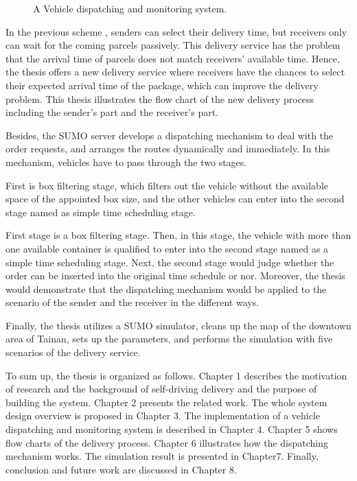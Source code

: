 \documentclass[12pt]{ksthesis}
\begin{document}
\begin{thesis}
{\begin{figure}[t]
\caption{\large A Vehicle dispatching and monitoring system.}
\vspace{0.5cm}
\label{Fig:System_Overview}
\end{figure}

In the previous scheme \cite{Jiang2018}, senders can select their delivery time, but receivers only can wait for the coming parcels passively. This delivery service has the problem that the arrival time of parcels does not match receivers’ available time. Hence, the thesis offers a new delivery service where receivers have the chances to select their expected arrival time of the package, which can improve the delivery problem. This thesis illustrates the flow chart of the new delivery process including the sender’s part and the receiver’s part.

Besides, the SUMO server develops a dispatching mechanism to deal with the order requests, and arranges the routes dynamically and immediately. In this mechanism, vehicles have to pass through the two stages. 

First is box filtering stage, which filters out the vehicle without the available space of the appointed box size, and the other vehicles can enter into the second stage named as simple time scheduling stage. 

First stage is a box filtering stage. Then, in this stage, the vehicle with more than one available container is qualified to enter into the second stage named as a simple time scheduling stage. Next, the second stage would judge whether the order can be inserted into the original time schedule or nor. Moreover, the thesis would demonstrate that the dispatching mechanism would be applied to the scenario of the sender and the receiver in the different ways.

Finally, the thesis utilizes a SUMO simulator, cleans up the map of the downtown area of Tainan, sets up the parameters, and performs the simulation with five scenarios of the delivery service.

To sum up, the thesis is organized as follows. Chapter 1 describes the motivation of research and the background of self-driving delivery and the purpose of building the system. Chapter 2 presents the related work. The whole system design overview is proposed in Chapter 3. The implementation of a vehicle dispatching and monitoring system is described in Chapter 4. Chapter 5 shows flow charts of the delivery process.  Chapter 6 illustrates how the dispatching mechanism works. The simulation result is presented in Chapter7. Finally, conclusion and future work are discussed in Chapter 8.


}
\end{thesis}
\end{document}
